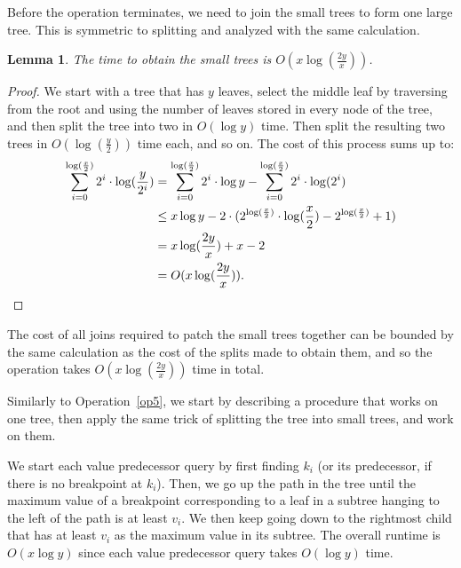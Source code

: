 \documentclass[11pt,a4paper]{article}
\newtheorem{lemma}{Lemma}
\theoremstyle{definition}
\theoremstyle{remark}
\begin{document}
Before the operation terminates, we need to join the small trees to form one large tree. This is symmetric to splitting and analyzed with the same
calculation.
\begin{lemma}
\label{running time to obtain small trees lemma}
The time to obtain the small trees is $O(x \log (\frac{2y}{x}))$.
\end{lemma}
\begin{proof}
We start with a tree that has $y$ leaves, select the middle leaf by traversing from the root and using the number of leaves stored in every node of the tree, and then split the tree into two in $O(\log y)$ time. Then split the resulting two trees in $O(\log(\frac{y}{2}))$ time each, and so on. The cost of this process sums up to:
\begin{align*}
 \sum_{i=0}^{\log (\frac{x}{2})} 2^i \cdot \log (\frac{y}{2^i}) & = \sum_{i=0}^{\log (\frac{x}{2})} 2^i \cdot \log y - \sum_{i=0}^{\log (\frac{x}{2})} 2^i \cdot \log (2^i)  \\
& \leq x \log y - 2 \cdot (2^{ \log ( \frac{x}{2})} \cdot \log ( \frac{x}{2}) - 2^{ \log ( \frac{x}{2})}+1)  \\
&= x \log (\frac{2y}{x}) + x -2 \\
& = O(x \log (\frac{2y}{x})) .\qedhere
\end{align*}
\end{proof}

The cost of all joins required to patch the small trees together can be bounded by the same calculation as the cost of the splits made to obtain them, and so the operation takes $O(x \log (\frac{2y}{x}))$ time in total.

\vspace{0.04in} 
Similarly to Operation~\ref{op5}, we start by describing a procedure that works on one tree, then apply the same trick of splitting the tree into small trees, and work on them.

We start each value predecessor query by first finding $k_i$ (or its predecessor, if there is no breakpoint at $k_i$). Then, we go up the path in the tree until the maximum value of a breakpoint corresponding to a leaf in a subtree hanging to the left of the path is at least $v_i$. We then keep going down to the rightmost child that has at least $v_i$ as the maximum value in its subtree. The overall runtime is $O(x \log y)$ since each value predecessor query takes $O(\log y)$ time.
\end{document}
